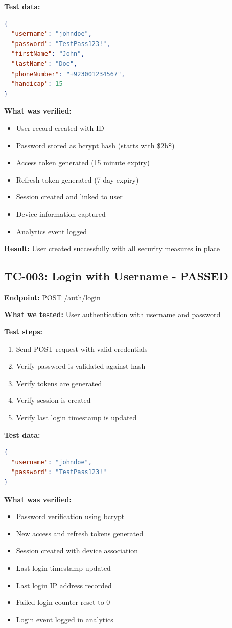 \documentclass[11pt,a4paper]{article}
\begin{document}
\textbf{Test data:}
\begin{lstlisting}[language=json]
{
  "username": "johndoe",
  "password": "TestPass123!",
  "firstName": "John",
  "lastName": "Doe",
  "phoneNumber": "+923001234567",
  "handicap": 15
}
\end{lstlisting}

\textbf{What was verified:}
\begin{itemize}
    \item User record created with ID
    \item Password stored as bcrypt hash (starts with \$2b\$)
    \item Access token generated (15 minute expiry)
    \item Refresh token generated (7 day expiry)
    \item Session created and linked to user
    \item Device information captured
    \item Analytics event logged
\end{itemize}

\textbf{Result:} User created successfully with all security measures in place

\subsection{TC-003: Login with Username - PASSED}
\textbf{Endpoint:} POST /auth/login

\textbf{What we tested:} User authentication with username and password

\textbf{Test steps:}
\begin{enumerate}
    \item Send POST request with valid credentials
    \item Verify password is validated against hash
    \item Verify tokens are generated
    \item Verify session is created
    \item Verify last login timestamp is updated
\end{enumerate}

\textbf{Test data:}
\begin{lstlisting}[language=json]
{
  "username": "johndoe",
  "password": "TestPass123!"
}
\end{lstlisting}

\textbf{What was verified:}
\begin{itemize}
    \item Password verification using bcrypt
    \item New access and refresh tokens generated
    \item Session created with device association
    \item Last login timestamp updated
    \item Last login IP address recorded
    \item Failed login counter reset to 0
    \item Login event logged in analytics
\end{itemize}
\end{document}
